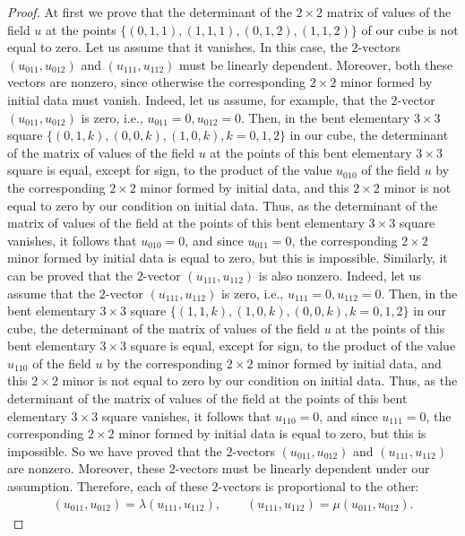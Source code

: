 \documentclass[11pt]{article}
\begin{document}
\begin{proof}
At f\/irst we prove that the determinant of the $2 \times 2$ matrix of
values of the f\/ield $u$ at the points $\{(0, 1, 1), (1, 1, 1), (0,
1, 2), (1, 1, 2)\}$ of our cube is not equal to zero. Let us assume
that it vanishes. In this case, the $2$-vectors $(u_{0 1 1}, u_{0 1
2})$ and $(u_{1 1 1}, u_{1 1 2})$ must be linearly dependent.
Moreover, both these vectors are nonzero, since otherwise the
corresponding $2 \times 2$ minor formed by initial data must vanish.
Indeed, let us assume, for example, that the $2$-vector $(u_{0 1 1},
u_{0 1 2})$ is zero, i.e., $u_{0 1 1} = 0, u_{0 1 2} = 0.$ Then, in
the bent elementary $3 \times 3$ square $\{(0, 1, k), (0, 0, k), (1,
0, k), k = 0, 1, 2\}$ in our cube, the determinant of the matrix of
values of the f\/ield $u$ at the points of this bent elementary $3
\times 3$ square is equal, except for sign, to the product of the
value $u_{0 1 0}$ of the f\/ield $u$ by the corresponding $2 \times 2$
minor formed by initial data, and this $2 \times 2$ minor is not
equal to zero by our condition on initial data. Thus, as the
determinant of the matrix of values of the f\/ield at the points of
this bent elementary $3 \times 3$ square vanishes, it follows that
$u_{0 1 0} = 0$, and since $u_{0 1 1} = 0$, the corresponding $2
\times 2$ minor formed by initial data is equal to zero, but this is
impossible. Similarly, it can be proved that the $2$-vector $(u_{1 1
1}, u_{1 1 2})$ is also nonzero. Indeed, let us assume that the
$2$-vector $(u_{1 1 1}, u_{1 1 2})$ is zero, i.e., $u_{1 1 1} = 0,
u_{1 1 2} = 0.$ Then, in the bent elementary $3 \times 3$ square
$\{(1, 1, k), (1, 0, k), (0, 0, k), k = 0, 1, 2\}$ in our cube, the
determinant of the matrix of values of the f\/ield $u$ at the points
of this bent elementary $3 \times 3$ square is equal, except for
sign, to the product of the value $u_{1 1 0}$ of the f\/ield $u$ by
the corresponding $2 \times 2$ minor formed by initial data, and
this $2 \times 2$ minor is not equal to zero by our condition on
initial data. Thus, as the determinant of the matrix of values of
the f\/ield at the points of this bent elementary $3 \times 3$ square
vanishes, it follows that $u_{1 1 0} = 0$, and since $u_{1 1 1} =
0$, the corresponding $2 \times 2$ minor formed by initial data is
equal to zero, but this is impossible. So we have proved that the
$2$-vectors $(u_{0 1 1}, u_{0 1 2})$ and $(u_{1 1 1}, u_{1 1 2})$
are nonzero. Moreover, these $2$-vectors must be linearly dependent
under our assumption. Therefore, each of these $2$-vectors is
proportional to the other: \begin{gather} (u_{0 1 1}, u_{0 1 2}) = \lambda
(u_{1 1 1}, u_{1 1 2}), \qquad (u_{1 1 1}, u_{1 1 2}) = \mu (u_{0 1
1}, u_{0 1 2}). \label{6xx} \end{gather}


\end{proof}
\end{document}
